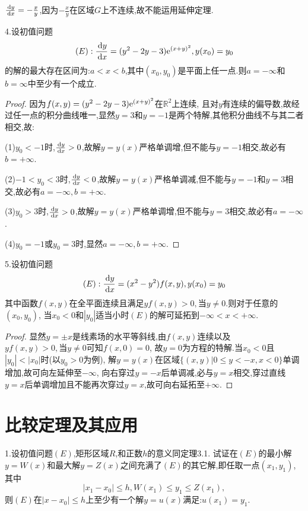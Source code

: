 \begin{solve}
$\frac{\,\mathrm{d} y}{\,\mathrm{d} x}=-\frac{x}{y}$,因为$-\frac{x}{y}$在区域$G$上不连续,故不能运用延伸定理.
\end{solve}


4.设初值问题
\[(E):\frac{\,\mathrm{d} y}{\,\mathrm{d} x}=(y^2-2y-3)\mathrm{e}^{(x+y)^2},y(x_0)=y_0\]
的解的最大存在区间为:$a<x<b$,其中$(x_0,y_0)$是平面上任一点.则$a=-\infty$和$b=\infty$中至少有一个成立.

\begin{proof}
因为$f(x,y)=(y^2-2y-3)\mathrm{e}^{(x+y)^2}$在$\mathbb{R}^2$上连续,
且对$y$有连续的偏导数,故经过任一点的积分曲线唯一,显然$y=3$和$y=-1$是两个特解,其他积分曲线不与其二者相交,故:

(1)$y_0<-1$时,$\frac{\,\mathrm{d} y}{\,\mathrm{d} x}>0$,故解$y=y(x)$严格单调增,但不能与$y=-1$相交,故必有$b=+\infty$.

(2)$-1<y_0<3$时,$\frac{\,\mathrm{d} y}{\,\mathrm{d} x}<0$,故解$y=y(x)$严格单调减,但不能与$y=-1$和$y=3$相交,故必有$a=-\infty,b=+\infty$.

(3)$y_0>3$时,$\frac{\,\mathrm{d} y}{\,\mathrm{d} x}>0$,故解$y=y(x)$严格单调增,但不能与$y=3$相交,故必有$a=-\infty$.

(4)$y_0=-1$或$y_0=3$时,显然$a=-\infty,b=+\infty$.
\end{proof}


5.设初值问题
\[(E):\frac{\,\mathrm{d} y}{\,\mathrm{d} x}=(x^2-y^2)f(x,y),y(x_0)=y_0\]
其中函数$f(x,y)$在全平面连续且满足$yf(x,y)>0,\mbox{当}y\neq0$.则对于任意的$(x_0,y_0)$,
当$x_0<0$和$|y_0|$适当小时$(E)$的解可延拓到$-\infty<x<+\infty$.

\begin{proof}
显然$y=\pm x$是线素场的水平等斜线,由$f(x,y)$连续以及$yf(x,y)>0,\mbox{当}y\neq0$可知$f(x,0)=0$,
故$y=0$为方程的特解.当$x_0<0$且$|y_0|<|x_0|$时(以$y_0>0$为例),
解$y=y(x)$在区域$\{(x,y)|0\leq y<-x,x<0\}$单调增加,故可向左延伸至$-\infty$,
向右穿过$y=-x$后单调减,必与$y=x$相交,穿过直线$y=x$后单调增加且不能再次穿过$y=x$,故可向右延拓至$+\infty$.
\end{proof}


\section{比较定理及其应用}


1.设初值问题$(E)$,矩形区域$R$,和正数$h$的意义同定理3.1.
试证在$(E)$的最小解$y=W(x)$和最大解$y=Z(x)$之间充满了$(E)$的其它解,即任取一点$(x_1,y_1)$,其中
\[|x_1-x_0|\leq h,W(x_1)\leq y_1\leq Z(x_1),\]
则$(E)$在$|x-x_0|\leq h$上至少有一个解$y=u(x)$满足:$u(x_1)=y_1$.

